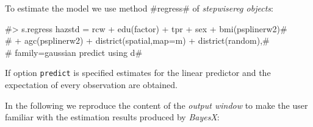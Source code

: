 \documentclass[11pt,a4paper,twoside]{bayesxreport}
\begin{document}
To estimate the model we use method #regress# of {\em stepwisereg
objects}:

 #> s.regress hazstd = rcw + edu(factor) + tpr + sex + bmi(psplinerw2)#\\
 #  + agc(psplinerw2) + district(spatial,map=m) + district(random),#\\
 #  family=gaussian predict using d#


If option {\tt predict} is specified estimates for the linear
predictor and the expectation of every observation are obtained.

In the following we reproduce the content of the {\em output window}
to make the user familiar with the estimation results produced by
{\em BayesX}:

\footnotesize
\end{document}
